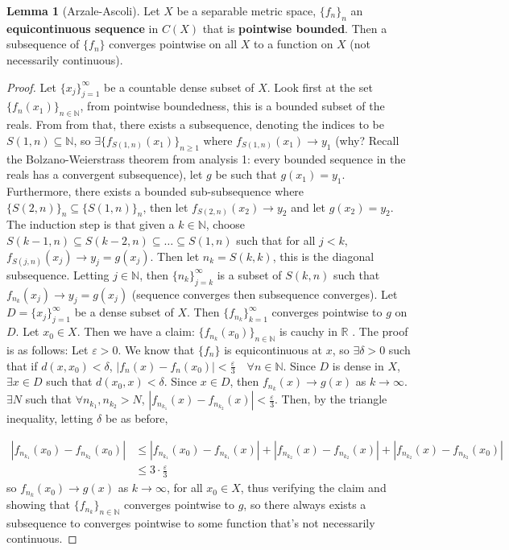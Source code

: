 \documentclass[12pt]{article}
\theoremstyle{definition}
\newtheorem{lemma}[theorem]{Lemma}
\begin{document}
\begin{lemma}[Arzale-Ascoli]
	Let $X$ be a separable metric space, $\{f_n\}_n$ an \textbf{equicontinuous sequence} in $C(X)$ that is \textbf{pointwise bounded}. Then a subsequence of $\{f_n\}$ converges pointwise on all $X$ to a function on $X$ (not necessarily continuous). 
\end{lemma}
\begin{proof}
	Let $\{x_j\}_{j=1}^\infty$ be a countable dense subset of $X$. Look first at the set $\{f_n(x_1)\}_{n \in \mathbb{N}}$, from pointwise boundedness, this is a bounded subset of the reals. From from that, there exists a subsequence, denoting the indices to be $S(1,n) \subseteq \mathbb{N}$, so $\exists \{f_{S(1,n)}(x_1)\}_{n \geq 1}$ where $f_{S(1,n)}(x_1) \to y_1$ (why? Recall the Bolzano-Weierstrass theorem from analysis 1: every bounded sequence in the reals has a convergent subsequence), let $g$ be such that $g(x_1) = y_1$. Furthermore, there exists a bounded sub-subsequence where $\{S(2,n)\}_n \subseteq \{S(1,n)\}_n$, then let $f_{S(2,n)}(x_2) \to y_2$ and let $g(x_2) = y_2$. The induction step is that given a $k \in \mathbb{N}$, choose
	$S(k-1,n) \subseteq S(k-2,n) \subseteq \ldots \subseteq S(1,n)$ such that for all $j < k$, $f_{S(j,n)} (x_j) \to y_j = g(x_j)$. Then let $n_k = S(k,k)$, this is the diagonal subsequence. Letting $j \in \mathbb{N}$, then $\{n_k\}_{j = k}^\infty$ is a subset of $S(k,n)$ such that $f_{n_k} (x_j) \to y_j = g(x_j)$ (sequence converges then subsequence converges). Let $D = \{x_j\}_{j=1}^\infty$ be a dense subset of $X$. Then $\{f_{n_k}\}_{k=1}^\infty$ converges pointwise to $g$ on $D$. Let $x_0 \in X$.  Then we have a claim: $\{f_{n_k}(x_0)\}_{n \in \mathbb{N}}$ is cauchy in $\mathbb{R}$ . The proof is as follows:
	Let $\varepsilon > 0 $. We know that $\{f_{n}\}$ is equicontinuous at $x$, so $\exists \delta > 0$ such that if $d(x,x_0) < \delta$, $|f_{n}(x) - f_n(x_0)| < \frac{\varepsilon}{3} \quad \forall n \in \mathbb{N}$. Since $D$ is dense in $X$, $\exists x \in D$ such that $d(x_0, x) < \delta$. Since $x \in D$, then $f_{n_k}(x) \to g(x)$ as $k \to \infty$. $\exists N$ such that $\forall n_{k_1}, n_{k_2} > N$, $|f_{n_{k_1}}(x) - f_{n_{k_2}}(x)| < \frac{\varepsilon}{3}$. Then, by the triangle inequality, letting $\delta$ be as before, 


	\begin{align*}
		|f_{n_{k_1}}(x_0) - f_{n_{k_2}} (x_0)| &\leq |f_{n_{k_1}}(x_0) - f_{n_{k_1}}(x)| + |f_{n_{k_2}}(x) - f_{n_{k_2}}(x)| + |f_{n_{k_2}}(x) - f_{n_{k_2}}(x_0)| \\
						       &\leq 3 \cdot \frac{\varepsilon}{3} 
	\end{align*}
	so $f_{n_k}(x_0) \to g(x)$ as $k \to \infty$, for all $x_0 \in X$, thus verifying the claim and showing that $\{f_{n_k}\}_{n \in \mathbb{N}}$ converges pointwise to $g$, so there always exists a subsequence to converges pointwise to some function that's not necessarily continuous. 
\end{proof}
\end{document}
